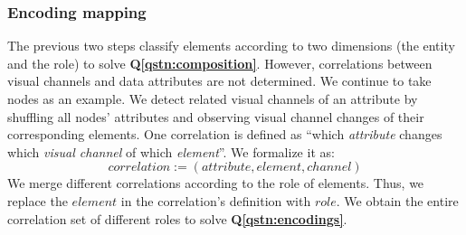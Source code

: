 \subsubsection{Encoding mapping}\label{sec:encodingmapping}
The previous two steps classify elements according to two dimensions (the entity and the role) to solve \textbf{Q\ref{qstn:composition}}.
However, correlations between visual channels and data attributes are not determined.
We continue to take nodes as an example.
We detect related visual channels of an attribute by shuffling all nodes' attributes and observing visual channel changes of their corresponding elements.
One correlation is defined as ``which \textit{attribute} changes which \textit{visual channel} of which \textit{element}''. We formalize it as:
\begin{equation}
    correlation := ( attribute, element, channel )
\end{equation}
We merge different correlations according to the role of elements.
Thus, we replace the $element$ in the correlation's definition with $role$.
We obtain the entire correlation set of different roles to solve \textbf{Q\ref{qstn:encodings}}.

